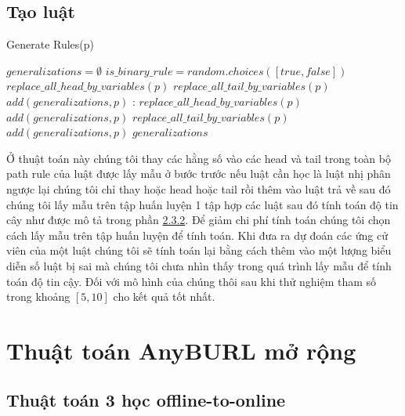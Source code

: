 \subsection{Tạo luật}
\begin{algorithm}
	\caption{Generate Rules(p)}\label{algorithm2}
	\begin{algorithmic}[1]
		\State $\textit{generalizations} = \emptyset$
		\State $is\_binary\_rule = random.choices([true,false])$
		\State $replace\_all\_head\_by\_variables(p)$
		\State $replace\_all\_tail\_by\_variables(p)$
		\State $add(generalizations, p)$
		\Else:
		\State $replace\_all\_head\_by\_variables(p)$
		\State $add(generalizations, p)$
		\State $replace\_all\_tail\_by\_variables(p)$
		\State $add(generalizations, p)$
		\EndIf
		\Return $generalizations$
		\EndProcedure
	\end{algorithmic}
\end{algorithm}

Ở thuật toán này chúng tôi thay các hằng số vào các head và tail trong toàn bộ path rule  của luật được lấy mẫu ở bước trước nếu luật cần học là luật nhị phân ngược lại chúng tôi chỉ thay hoặc head hoặc tail rồi thêm vào luật trả về sau đó chúng tôi lấy mẫu trên tập huấn luyện 1 tập hợp các luật sau đó tính toán độ tin cây như được mô tả trong phần \hyperref[kg]{2.3.2}. Để giảm chi phí tính toán chúng tôi chọn cách lấy mẫu trên tập huấn luyện để tính toán. Khi đưa ra dự đoán các ứng cử viên của một luật chúng tôi sẽ tính toán lại bằng cách thêm vào một lượng biểu diễn số luật bị sai mà chúng tôi chưa nhìn thấy trong quá trình lấy mẫu để tính toán độ tin cậy. Đối với mô hình của chúng thôi sau khi thử nghiệm tham số trong khoảng \([5, 10]\) cho kết quả tốt nhất.
\section{Thuật toán AnyBURL mở rộng}
\subsection{Thuật toán 3 học offline-to-online}

